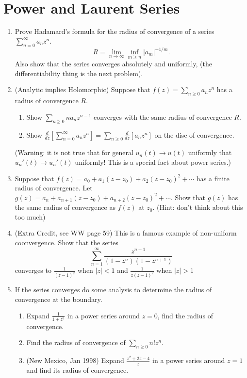 \documentclass[a4paper,10pt]{article}
\begin{document}
\newpage 
\section{Power and Laurent Series}

\begin{enumerate}

\item Prove Hadamard's formula for the radius of convergence of a series $\sum_{n=0}^{\infty} a_n z^n$.
 $$ R = \lim_{n\to \infty} \inf_{m\geq n} \vert a_m \vert^{-1/m}.$$
Also show that the series converges absolutely and uniformly, (the differentiability thing is the next problem).

\item (Analytic implies Holomorphic) Suppose that $f(z) = \sum_{n\geq0} a_n z^n$ has a radius of convergence $R$. 
\begin{enumerate}
 \item Show $\sum_{n\geq 0} n a_n z^{n-1}$ converges with the same radius of convergence $R$.
 \item Show $\frac{d}{dz}\left[ \sum_{n=0}^{\infty} a_nz^{n}\right] = \sum_{n\geq 0} \frac{d}{dz}[ a_n z^{n}]$ on the disc of convergence.
\end{enumerate}
(Warning: it is not true that for general $u_n(t)\to u(t)$ uniformly that $u_n'(t) \to u_n'(t)$ uniformly! This is a special fact about power series.)


\item Suppose that $f(z) = a_0 + a_1(z-z_0) + a_2 (z-z_0)^2 + \cdots$ has a finite radius of convergence. 
Let $g(z) = a_n+ a_{n+1} (z-z_0) + a_{n+2}(z-z_0)^2 + \cdots$. Show that $g(z)$ has the same radius of convergence as $f(z)$ at $z_0$. (Hint: don't think about this too much)


\item (Extra Credit, see WW page 59) This is a famous example of non-uniform coonvergence. Show that the series
 $$ \sum_{n =1}^{\infty} \frac{z^{n-1} }{(1-z^n)(1-z^{n+1})}$$
 converges to $\frac{1}{(z-1)^2}$ when $\vert z \vert <1$ and $\frac{1}{z(z-1)^2}$ when $\vert z \vert > 1$


\item 
If the series converges do some analysis to determine the radius of convergence at the boundary.
\begin{enumerate}
\item Expand $\frac{1}{1+z^2}$ in a power series around $z=0$, find the radius of convergence.
\item Find the radius of convergence of $\sum_{n\geq 0} n! z^n$.
\item (New Mexico, Jan 1998) Expand $\frac{z^2+2z-4}{z}$ in a power series around $z=1$ and find its radius of convergence.
\end{enumerate}



\end{enumerate}
\end{document}

